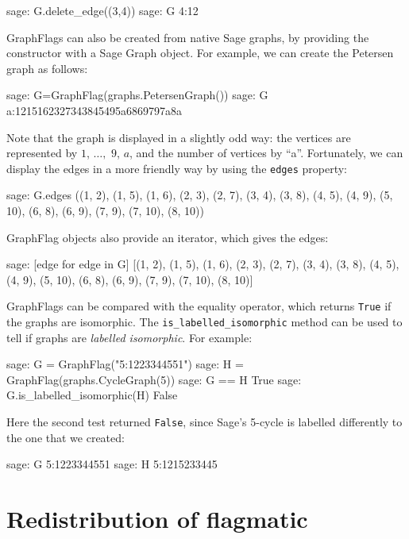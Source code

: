 \documentclass{article}
\begin{document}
\begin{sage}
sage: G.delete_edge((3,4))
sage: G
4:12
\end{sage}

GraphFlags can also be created from native Sage graphs, by providing the constructor with a Sage Graph object. For example, we can create the Petersen graph as follows:

\begin{sage}
sage: G=GraphFlag(graphs.PetersenGraph())
sage: G
a:1215162327343845495a6869797a8a
\end{sage}

Note that the graph is displayed in a slightly odd way: the vertices are represented by $1$, $\dots,$ $9$, $a$, and the number of vertices by ``a''. Fortunately, we can display the edges in a more friendly way by using the \verb|edges| property:

\begin{sage}
sage: G.edges
((1, 2), (1, 5), (1, 6), (2, 3), (2, 7), (3, 4), (3, 8), (4, 5), (4, 9),
(5, 10), (6, 8), (6, 9), (7, 9), (7, 10), (8, 10))
\end{sage}

GraphFlag objects also provide an iterator, which gives the edges:

\begin{sage}
sage: [edge for edge in G]
[(1, 2), (1, 5), (1, 6), (2, 3), (2, 7), (3, 4), (3, 8), (4, 5), (4, 9),
(5, 10), (6, 8), (6, 9), (7, 9), (7, 10), (8, 10)]
\end{sage}

GraphFlags can be compared with the equality operator, which returns \verb|True| if the graphs are isomorphic. The \verb|is_labelled_isomorphic| method can be used to tell if graphs are \emph{labelled isomorphic}. For example:

\begin{sage}
sage: G = GraphFlag("5:1223344551")
sage: H = GraphFlag(graphs.CycleGraph(5))
sage: G == H
True
sage: G.is_labelled_isomorphic(H)
False
\end{sage}

Here the second test returned \verb|False|, since Sage's 5-cycle is labelled differently to the one that we created:

\begin{sage}
sage: G
5:1223344551
sage: H
5:1215233445
\end{sage}


\section{Redistribution of flagmatic} \label{license}
\end{document}
